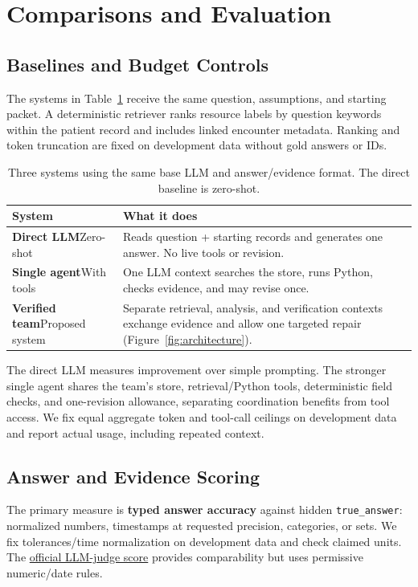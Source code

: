\documentclass[sigconf,nonacm]{acmart}
\begin{document}
\section{Comparisons and Evaluation}
\subsection{Baselines and Budget Controls}
The systems in Table~\ref{tab:systems} receive the same question, assumptions, and starting packet. A deterministic retriever ranks resource labels by question keywords within the patient record and includes linked encounter metadata. Ranking and token truncation are fixed on development data without gold answers or IDs.

\begin{table}[!t]
\caption{Three systems using the same base LLM and answer/evidence format. The direct baseline is zero-shot.}
\label{tab:systems}
\centering
\small
\setlength{\tabcolsep}{3pt}
\begin{tabular}{@{}>{\raggedright\arraybackslash}p{}>{\raggedright\arraybackslash}p{}@{}}
\toprule
System & What it does \\
\midrule
\textbf{Direct LLM}\newline Zero-shot & Reads question + starting records and generates one answer. No live tools or revision. \\
\addlinespace[3pt]
\textbf{Single agent}\newline With tools & One LLM context searches the store, runs Python, checks evidence, and may revise once. \\
\addlinespace[3pt]
\textbf{Verified team}\newline Proposed system & Separate retrieval, analysis, and verification contexts exchange evidence and allow one targeted repair (Figure~\ref{fig:architecture}). \\
\bottomrule
\end{tabular}
\end{table}

The direct LLM measures improvement over simple prompting. The stronger single agent shares the team's store, retrieval/Python tools, deterministic field checks, and one-revision allowance, separating coordination benefits from tool access. We fix equal aggregate token and tool-call ceilings on development data and report actual usage, including repeated context.

\subsection{Answer and Evidence Scoring}
The primary measure is \textbf{typed answer accuracy} against hidden \texttt{true\_answer}: normalized numbers, timestamps at requested precision, categories, or sets. We fix tolerances/time normalization on development data and check claimed units. The \href{https://github.com/glee4810/FHIR-AgentBench/blob/master/evaluation_metrics.py}{official LLM-judge score} provides comparability but uses permissive numeric/date rules.
\end{document}
